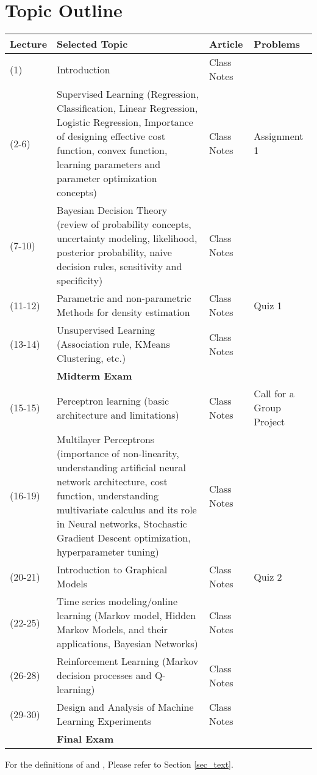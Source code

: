 \section{Topic Outline}
\begin{longtable}{p{1.5cm} p{10.25cm} p{2cm} p{2.5cm}}
\toprule
\textbf{Lecture} & \textbf{Selected Topic} & \textbf{Article} & \textbf{Problems} \\ \midrule
{(1)} & Introduction &  {Class Notes} &  {} \\
(2-6) & Supervised Learning (Regression, Classification, Linear Regression, Logistic Regression, Importance of designing effective cost function, convex function, learning parameters and parameter optimization concepts) &  {Class Notes} &  {} Assignment 1\\
(7-10) & Bayesian Decision Theory (review of probability concepts, uncertainty modeling, likelihood, posterior probability, naive decision rules, sensitivity and specificity) &  {Class Notes} &  {} \\
(11-12) & Parametric and non-parametric Methods for density estimation &  {Class Notes} &  {Quiz 1} \\
(13-14) & Unsupervised Learning (Association rule, KMeans Clustering, etc.) &  {Class Notes} &  {} \\
 & \textbf{Midterm Exam} &  &  \\
(15-15) & Perceptron learning (basic architecture and limitations) &  {Class Notes} &  {Call for a Group Project} \\
(16-19) & Multilayer Perceptrons (importance of non-linearity, understanding artificial neural network architecture, cost function, understanding multivariate calculus and its role in Neural networks, Stochastic Gradient Descent optimization, hyperparameter tuning) &  {Class Notes} &  {} \\
(20-21) & Introduction to Graphical Models &  {Class Notes} &  {Quiz 2} \\
(22-25) & Time series modeling/online learning (Markov model, Hidden Markov Models, and their applications, Bayesian Networks) &  {Class Notes} &  {} \\
(26-28) & Reinforcement Learning (Markov decision processes and Q-learning) &  {Class Notes} &  {} \\
(29-30) & Design and Analysis of Machine Learning Experiments &  {Class Notes} &  {} \\ 
 & \textbf{Final Exam} &  &  \\ \bottomrule
\end{longtable}
For the definitions of  {} and \fromRef{}, Please refer to Section \ref{sec_text}. 
